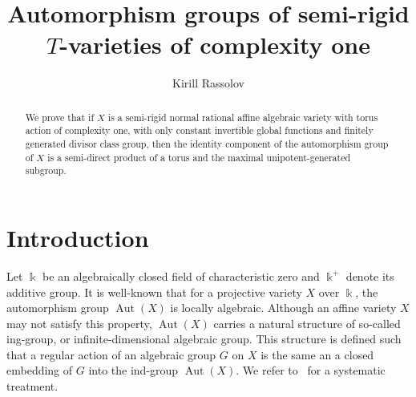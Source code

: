 \documentclass[a4paper,reqno,12pt]{amsart}
\title{Automorphism groups of semi-rigid $T$-varieties of complexity one}
\author{Kirill Rassolov}
\date{}
\theoremstyle{theorem}
\theoremstyle{definition}
\theoremstyle{theorem}
\theoremstyle{remark}
\DeclareMathOperator{\Aut}{Aut}
\newcommand{\UU}{\mathcal U}
\newcommand{\kk}{\Bbbk}
\newcommand{\0}{\circ}
\begin{document}
\maketitle

\begin{abstract}
    We prove that if $X$ is a semi-rigid normal rational affine algebraic variety with torus action of complexity one, with only constant invertible global functions and finitely generated divisor class group, then the identity component of the automorphism group of $X$ is a semi-direct product of a torus and the maximal unipotent-generated subgroup.
\end{abstract}




\section*{Introduction}
Let $\kk$ be an algebraically closed field of characteristic zero and $\kk^+$ denote its additive group. It is well-known that for a projective variety $X$ over $\kk$, the automorphism group $\Aut(X)$ is locally algebraic. Although an affine variety $X$ may not satisfy this property, $\Aut(X)$ carries a natural structure of so-called ing-group, or infinite-dimensional algebraic group. This structure is defined such that a regular action of an algebraic group $G$ on $X$ is the same an a closed embedding of $G$ into the ind-group $\Aut(X)$. We refer to~\cite{FK} for a systematic treatment. 
 
\end{document}
